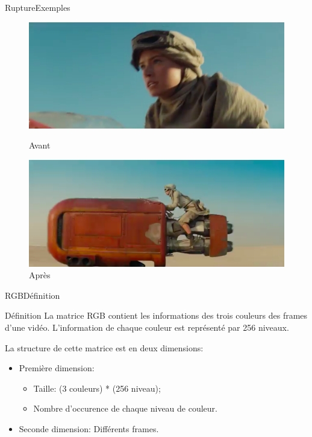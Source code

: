 \begin{frame}{Rupture}{Exemples}
\begin{figure}
   \begin{minipage}[c]{.46\linewidth}
	  \centering
      \includegraphics[scale=0.2]{images/rupture2-1.png}
      \caption{Avant}
   \end{minipage} \hfill
   \begin{minipage}[c]{.46\linewidth}
      \centering
      \includegraphics[scale=0.2]{images/rupture2-2.png}
      \caption{Après}
   \end{minipage}
\end{figure}

\end{frame}

\begin{frame}{RGB}{Définition}
\begin{block}{Définition}
La matrice RGB contient les informations des trois couleurs des frames d'une vidéo. L'information de chaque couleur est représenté par 256 niveaux.

La structure de cette matrice est en deux dimensions:

\begin{itemize}
	\item Première dimension: 
		\begin{itemize}
			\item Taille: (3 couleurs) * (256 niveau);
			\item Nombre d'occurence de chaque niveau de couleur.
		\end{itemize}
	\item Seconde dimension: Différents frames.
\end{itemize}

\end{block}

\end{frame}

